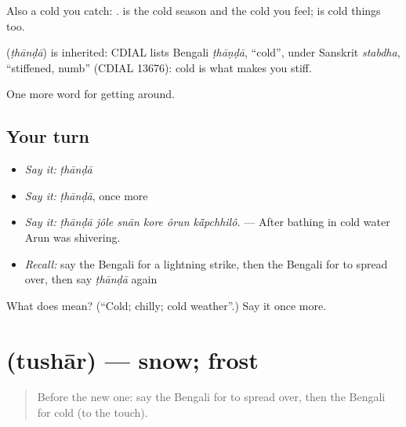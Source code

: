 Also a cold you catch:  .  is the cold season and the cold you feel;  is cold things too.

\begin{cousinweb}
\textbf{} (\emph{ṭhānḍā}) is inherited: CDIAL lists Bengali \emph{ṭhāṇḍā}, \textquotedblleft{}cold\textquotedblright{}, under Sanskrit \emph{stabdha}, \textquotedblleft{}stiffened, numb\textquotedblright{} (CDIAL 13676): cold is what makes you stiff.
\end{cousinweb}

\begin{grammarlens}[title={What you've built}]
One more word for getting around.
\end{grammarlens}

\subsection*{Your turn}
\begin{itemize}
\raggedright
  \item \emph{Say it:} \emph{ṭhānḍā}
  \item \emph{Say it:} \emph{ṭhānḍā}, once more
  \item \emph{Say it:} \emph{ṭhānḍā jôle snān kore ôrun kā̃pchhilô.} — After bathing in cold water Arun was shivering.
  \item \emph{Recall:} say the Bengali for a lightning strike, then the Bengali for to spread over, then say \emph{ṭhānḍā} again
\end{itemize}

\begin{tcolorbox}[breakable,colback=teal!4,colframe=teal!35!black,title={Before you move on}]
What does  mean? (\textquotedblleft{}Cold; chilly; cold weather\textquotedblright{}.) Say it once more.
\end{tcolorbox}
\section[\texorpdfstring{\bn{তুষার} (tushār)}{তুষার (tushār)}]{ (tushār) — snow; frost}

\label{lesson:BN-C426-tushar}



\begin{quote}
Before the new one: say the Bengali for to spread over, then the Bengali for cold (to the touch).
\end{quote}

